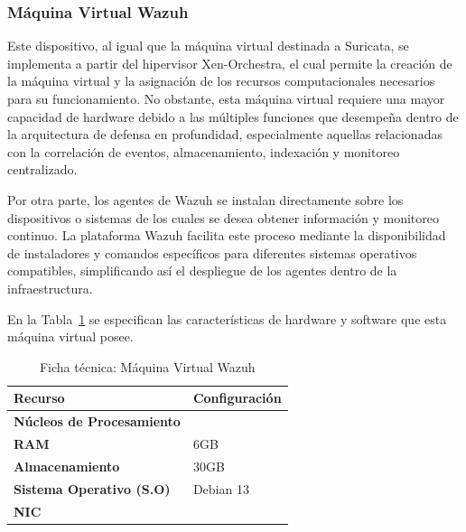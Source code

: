 \subsubsection{Máquina Virtual Wazuh}
\noindent

Este dispositivo, al igual que la máquina virtual destinada a Suricata, se implementa a partir del hipervisor Xen-Orchestra, el cual 
permite la creación de la máquina virtual y la asignación de los recursos computacionales necesarios para su funcionamiento. No obstante, 
esta máquina virtual requiere una mayor capacidad de hardware debido a las múltiples funciones que desempeña dentro de la arquitectura de 
defensa en profundidad, especialmente aquellas relacionadas con la correlación de eventos, almacenamiento, indexación y monitoreo 
centralizado.

Por otra parte, los agentes de Wazuh se instalan directamente sobre los dispositivos o sistemas de los cuales se desea obtener información 
y monitoreo continuo. La plataforma Wazuh facilita este proceso mediante la disponibilidad de instaladores y comandos específicos para 
diferentes sistemas operativos compatibles, simplificando así el despliegue de los agentes dentro de la infraestructura.

En la Tabla~\ref{tab:vm-wazuh} se especifican las características de hardware y software que esta máquina virtual posee.

\begin{table}[H]
	\centering
	\sffamily\small
	\renewcommand{\arraystretch}{1.4}
	\setlength{\tabcolsep}{8pt}
	\caption{Ficha técnica: Máquina Virtual Wazuh}\label{tab:vm-wazuh}
	
	\begin{tabular}{|p{}|p{}|}
		\hline
		\rowcolor{blue!40}
		\centering\textbf{Recurso} & \centering\textbf{Configuración} \tabularnewline
		\hline
		
		\centering\textbf{Núcleos de Procesamiento} & \centering 6 \tabularnewline
		\hline
		
		\centering\textbf{RAM} & \centering 6GB \tabularnewline
		\hline
		
		\centering\textbf{Almacenamiento} & \centering 30GB \tabularnewline
		\hline
		
		\centering\textbf{Sistema Operativo (S.O)} & \centering Debian 13 \tabularnewline
		\hline
		
		\centering\textbf{NIC} & \centering 1 \tabularnewline
		\hline
	\end{tabular}
\end{table}

